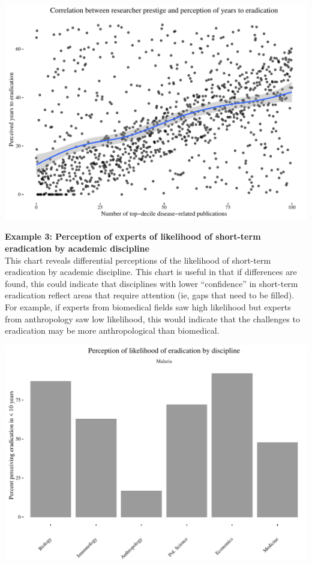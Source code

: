 \documentclass{article}
\begin{document}
\begin{center}
\includegraphics{chart2.pdf}
\end{center}

\newpage
\noindent \textbf{Example 3: Perception of experts of likelihood of short-term eradication by academic discipline} \\
\noindent This chart reveals differential perceptions of the likelihood of short-term eradication by academic discipline. This chart is useful in that if differences are found, this could indicate that disciplines with lower “confidence” in short-term eradication reflect areas that require attention (ie, gaps that need to be filled). For example, if experts from biomedical fields saw high likelihood but experts from anthropology saw low likelihood, this would indicate that the challenges to eradication may be more anthropological than biomedical.

\begin{center}
\includegraphics{chart3.pdf}
\end{center}
\end{document}
